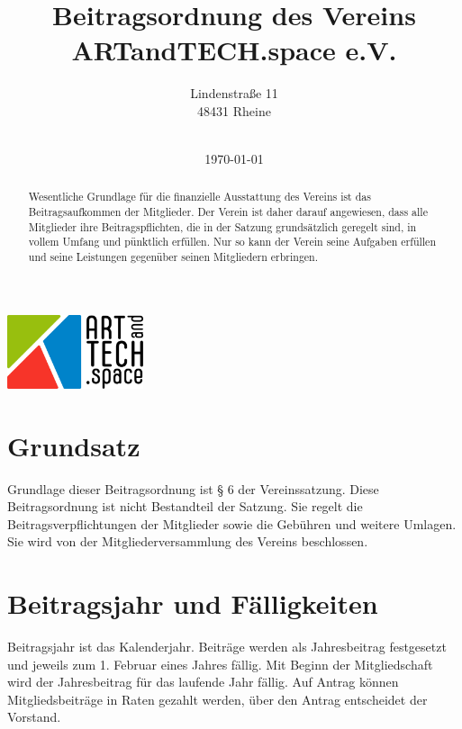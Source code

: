 \documentclass[12pt]{article}
\title{Beitragsordnung des Vereins \\
ARTandTECH.space e.V.}
\author{
	Lindenstraße 11 \\
	48431 Rheine \\
    \
	}
\date{\today}
\begin{document}
\maketitle
\thispagestyle{empty}

\begin{center}
	\includegraphics[width=0.3\textwidth]{assets/logo.png}
\end{center}

\begin{abstract}
	Wesentliche Grundlage für die finanzielle Ausstattung des Vereins ist das Beitragsaufkommen der Mitglieder.
	Der Verein ist daher darauf angewiesen, dass alle Mitglieder ihre Beitragspflichten, die in der Satzung grundsätzlich
	geregelt sind, in vollem Umfang und pünktlich erfüllen. Nur so kann der Verein seine Aufgaben erfüllen und seine
	Leistungen gegenüber seinen Mitgliedern erbringen.
\end{abstract}
\newpage

\pagestyle{fancy}
\fancyhf{}
\tableofcontents
\thispagestyle{fancy}
\newpage

\setcounter{page}{1}

\section{Grundsatz}
Grundlage dieser Beitragsordnung ist § 6 der Vereinssatzung. Diese Beitragsordnung ist nicht Bestandteil der Satzung.
Sie regelt die Beitragsverpflichtungen der Mitglieder sowie die Gebühren und weitere Umlagen. Sie wird von der
Mitgliederversammlung des Vereins beschlossen.

\section{Beitragsjahr und Fälligkeiten}
Beitragsjahr ist das Kalenderjahr. Beiträge werden als Jahresbeitrag festgesetzt und jeweils zum 1. Februar eines Jahres fällig.
Mit Beginn der Mitgliedschaft wird der Jahresbeitrag für das laufende Jahr fällig.
Auf Antrag können Mitgliedsbeiträge in Raten gezahlt werden, über den Antrag entscheidet der Vorstand.
\end{document}
